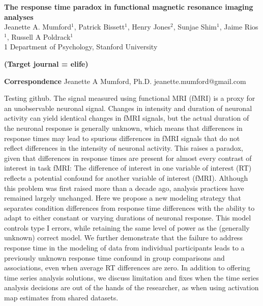 \documentclass[titlepage,12pt] {article}
\begin{document}
\begin{titlepage}
\begin{center}
{\large\textbf{The response time paradox in functional magnetic resonance imaging analyses
}}\\
{Jeanette A. Mumford$^1$, Patrick Bissett$^1$, Henry Jones$^2$, Sunjae Shim$^1$, Jaime Rios$^1$, Russell A Poldrack$^1$\\
  \small{1} Department of Psychology, Stanford University }
\end{center}


\textbf{(Target journal = elife)}

\vspace{2.8in}
\begin{singlespace}
  \hspace{0.1in}\newline
\textbf{Correspondence}\newline 
Jeanette A Mumford, Ph.D. \newline 
jeanette.mumford@gmail.com \newline
\end{singlespace}

\newpage
{}

Testing github.  
The signal measured using functional MRI (fMRI) is a proxy for an unobservable neuronal signal. Changes in intensity and duration of neuronal activity can yield identical changes in fMRI signals, but the actual duration of the neuronal response is generally unknown, which means that differences in response times may lead to spurious differences in fMRI signals that do not reflect differences in the intensity of neuronal activity.  This raises a paradox, given that differences in response times are present for almost every contrast of interest in task fMRI: The difference of interest in one variable of interest (RT) reflects a potential confound for another variable of interest (fMRI).  Although this problem was first raised more than a decade ago, analysis practices have remained largely unchanged.  Here we propose a new modeling strategy that separates condition differences from response time differences with the ability to adapt to either constant or varying durations of neuronal response.  This model controls type I errors, while retaining the same level of power as the (generally unknown) correct model.  We further demonstrate that the failure to address response time in the modeling of data from individual participants leads to a previously unknown response time confound in group comparisons and associations, even when average RT differences are zero.  In addition to offering time series analysis solutions, we discuss limitation and fixes when the time series analysis decisions are out of the hands of the researcher, as when using activation map estimates from shared datasets.


\vspace{.1in}


\end{titlepage}
\end{document}
